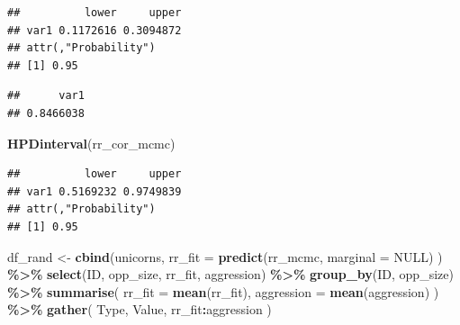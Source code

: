 \documentclass[
  12pt,
]{book}
\newenvironment{Shaded}{\begin{snugshade}}{\end{snugshade}}
\newcommand{\DataTypeTok}[1]{\textcolor[rgb]{0.13,0.29,0.53}{#1}}
\newcommand{\KeywordTok}[1]{\textcolor[rgb]{0.13,0.29,0.53}{\textbf{#1}}}
\newcommand{\NormalTok}[1]{#1}
\newcommand{\OperatorTok}[1]{\textcolor[rgb]{0.81,0.36,0.00}{\textbf{#1}}}
\newcommand{\OtherTok}[1]{\textcolor[rgb]{0.56,0.35,0.01}{#1}}
\newcommand{\StringTok}[1]{\textcolor[rgb]{0.31,0.60,0.02}{#1}}
\begin{document}
\begin{verbatim}
##          lower     upper
## var1 0.1172616 0.3094872
## attr(,"Probability")
## [1] 0.95
\end{verbatim}

\begin{Shaded}
\end{Shaded}

\begin{verbatim}
##      var1 
## 0.8466038
\end{verbatim}

\begin{Shaded}
\begin{Highlighting}[]
\KeywordTok{HPDinterval}\NormalTok{(rr\_cor\_mcmc)}
\end{Highlighting}
\end{Shaded}

\begin{verbatim}
##          lower     upper
## var1 0.5169232 0.9749839
## attr(,"Probability")
## [1] 0.95
\end{verbatim}

\begin{Shaded}
\begin{Highlighting}[]
\NormalTok{df\_rand \textless{}{-}}\StringTok{ }\KeywordTok{cbind}\NormalTok{(unicorns,}
  \DataTypeTok{rr\_fit =} \KeywordTok{predict}\NormalTok{(rr\_mcmc, }\DataTypeTok{marginal =} \OtherTok{NULL}\NormalTok{)}
\NormalTok{) }\OperatorTok{\%\textgreater{}\%}
\StringTok{  }\KeywordTok{select}\NormalTok{(ID, opp\_size, rr\_fit, aggression) }\OperatorTok{\%\textgreater{}\%}
\StringTok{  }\KeywordTok{group\_by}\NormalTok{(ID, opp\_size) }\OperatorTok{\%\textgreater{}\%}
\StringTok{  }\KeywordTok{summarise}\NormalTok{(}
    \DataTypeTok{rr\_fit =} \KeywordTok{mean}\NormalTok{(rr\_fit),}
    \DataTypeTok{aggression =} \KeywordTok{mean}\NormalTok{(aggression)}
\NormalTok{  ) }\OperatorTok{\%\textgreater{}\%}
\StringTok{  }\KeywordTok{gather}\NormalTok{(}
\NormalTok{    Type, Value,}
\NormalTok{    rr\_fit}\OperatorTok{:}\NormalTok{aggression}
\NormalTok{  )}
\end{Highlighting}
\end{Shaded}
\end{document}
